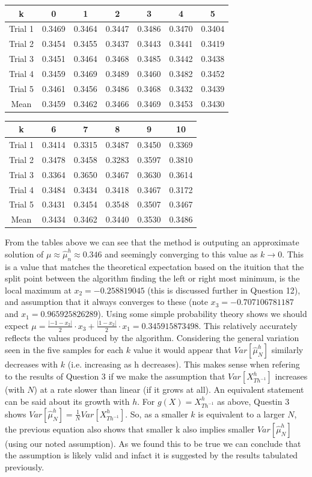 \documentclass{article}
\begin{document}
\begin{center}
\begin{tabular}{ c | c c c c c c } 
 k &  0 & 1 & 2 &3 &4&5 \\
\hline 
Trial 1&0.3469&0.3464&0.3447&0.3486&0.3470&0.3404\\
Trial 2&0.3454&0.3455&0.3437&0.3443&0.3441&0.3419\\
Trial 3&0.3451&0.3464&0.3468&0.3485&0.3442&0.3438\\
Trial 4&0.3459&0.3469&0.3489&0.3460&0.3482&0.3452\\
Trial 5&0.3461&0.3456&0.3486&0.3468&0.3432&0.3439\\
\hline
Mean&0.3459&0.3462&0.3466&0.3469&0.3453&0.3430\\
\end{tabular}
\end{center}

\begin{center}
\begin{tabular}{ c | c c c c c } 
 k & 6&7&8&9&10 \\
\hline 
Trial 1&0.3414&0.3315&0.3487&0.3450&0.3369 \\
Trial 2&0.3478&0.3458&0.3283&0.3597&0.3810 \\
Trial 3&0.3364&0.3650&0.3467&0.3630&0.3614 \\
Trial 4&0.3484&0.3434&0.3418&0.3467&0.3172 \\
Trial 5&0.3431&0.3454&0.3548&0.3507&0.3467 \\
\hline
Mean&0.3434&0.3462&0.3440&0.3530&0.3486 \\
\end{tabular}
\end{center}
From the tables above we can see that the method is outputing an approximate solution of $\mu \approx \hat\mu_n^h \approx 0.346$ and seemingly converging to this value as $k \to 0$. This is a value that matches the theoretical expectation based on the ituition that the split point between the algorithm finding the left or right most minimum, is the local maximum at $x_2=-0.258819045$ (this is discussed further in Question 12), and assumption that it always converges to these (note $x_3=-0.707106781187$ and $x_1=0.965925826289$). Using some simple probability theory shows we should expect $\mu = \frac{|-1-x_2|}{2} \cdot x_3 + \frac{|1-x_2|}{2} \cdot x_1=0.345915873498$. This relatively accurately reflects the values produced by the algorithm. Considering the general variation seen in the five samples for each $k$ value it would appear that $Var[\hat\mu_N^h]$ similarly decreases with $k$ (i.e. increasing as h decreases). This makes sense when refering to the results of Question 3 if we make the assumption that $Var[X_{Th^{-1}}^h]$ increases (with $N$) at a rate slower than linear (if it grows at all). An equivalent statement can be said about its growth with $h$. For $g(X)=X_{Th^{-1}}^h$ as above, Questin 3 shows $Var[\hat\mu_N^h]= \frac{1}{N} Var[X_{Th^{-1}}^h]$. So, as a smaller $k$ is equivalent to a larger $N$, the previous equation also shows that smaller k also implies smaller $Var[\hat\mu_N^h]$ (using our noted assumption). As we found this to be true we can conclude that the assumption is likely valid and infact it is suggested by the results tabulated previously. 
\end{document}
